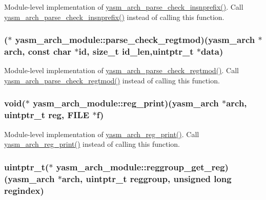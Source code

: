 Module-\/level implementation of \hyperlink{arch_8h_aebc146ab82bc5436dda1309ee6e03973}{yasm\-\_\-arch\-\_\-parse\-\_\-check\-\_\-insnprefix()}. Call \hyperlink{arch_8h_aebc146ab82bc5436dda1309ee6e03973}{yasm\-\_\-arch\-\_\-parse\-\_\-check\-\_\-insnprefix()} instead of calling this function. \hypertarget{structyasm__arch__module_a3ebd6e4bda71c110b9455b3965c148dd}{
\subsubsection[{parse\-\_\-check\-\_\-regtmod}]{($\ast$ yasm\-\_\-arch\-\_\-module\-::parse\-\_\-check\-\_\-regtmod)({\bf yasm\-\_\-arch} $\ast$arch, const char $\ast$id, size\-\_\-t id\-\_\-len,uintptr\-\_\-t $\ast$data)}}\label{structyasm__arch__module_a3ebd6e4bda71c110b9455b3965c148dd}
Module-\/level implementation of \hyperlink{arch_8h_ae5629c839eb94f1635d8cf52bc1a2fae}{yasm\-\_\-arch\-\_\-parse\-\_\-check\-\_\-regtmod()}. Call \hyperlink{arch_8h_ae5629c839eb94f1635d8cf52bc1a2fae}{yasm\-\_\-arch\-\_\-parse\-\_\-check\-\_\-regtmod()} instead of calling this function. \hypertarget{structyasm__arch__module_a6dc5cfaa6ddd2c654abf3599ba219ef0}{
\subsubsection[{reg\-\_\-print}]{\setlength{\rightskip}{0pt plus 5cm}void($\ast$ yasm\-\_\-arch\-\_\-module\-::reg\-\_\-print)({\bf yasm\-\_\-arch} $\ast$arch, uintptr\-\_\-t reg, F\-I\-L\-E $\ast$f)}}\label{structyasm__arch__module_a6dc5cfaa6ddd2c654abf3599ba219ef0}
Module-\/level implementation of \hyperlink{arch_8h_aba11eeccc9e706a2ce6e1e33eb9e7b64}{yasm\-\_\-arch\-\_\-reg\-\_\-print()}. Call \hyperlink{arch_8h_aba11eeccc9e706a2ce6e1e33eb9e7b64}{yasm\-\_\-arch\-\_\-reg\-\_\-print()} instead of calling this function. \hypertarget{structyasm__arch__module_a482192e63715c1c9e92fe96ecb42c097}{
\subsubsection[{reggroup\-\_\-get\-\_\-reg}]{\setlength{\rightskip}{0pt plus 5cm}uintptr\-\_\-t($\ast$ yasm\-\_\-arch\-\_\-module\-::reggroup\-\_\-get\-\_\-reg)({\bf yasm\-\_\-arch} $\ast$arch, uintptr\-\_\-t reggroup, unsigned long regindex)}}\label{structyasm__arch__module_a482192e63715c1c9e92fe96ecb42c097}
